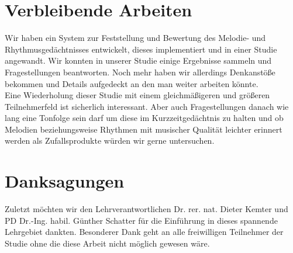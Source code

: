 \documentclass{acm_proc_article-sp}
\begin{document}
\section{Verbleibende Arbeiten}
Wir haben ein System zur Feststellung und Bewertung des Melodie- und Rhythmusgedächtnisses entwickelt, dieses implementiert und in einer Studie angewandt.  
Wir konnten in unserer Studie einige Ergebnisse sammeln und Fragestellungen beantworten. Noch mehr haben wir allerdings Denkanstöße bekommen und Details aufgedeckt an den man weiter arbeiten könnte.\\
Eine Wiederholung dieser Studie mit einem gleichmäßigeren und größeren Teilnehmerfeld ist sicherlich interessant. Aber auch Fragestellungen danach wie lang eine Tonfolge sein darf um diese im Kurzzeitgedächtnis zu halten und ob Melodien beziehungsweise Rhythmen mit musischer Qualität leichter erinnert werden als Zufallsprodukte würden wir gerne untersuchen.

\section{Danksagungen}
Zuletzt möchten wir den Lehrverantwortlichen Dr. rer. nat. Dieter Kemter und PD Dr.-Ing. habil. Günther Schatter für die Einführung in dieses spannende Lehrgebiet dankten. Besonderer Dank geht an alle freiwilligen Teilnehmer der Studie ohne die diese Arbeit nicht möglich gewesen wäre.

\printbibliography
\end{document}
